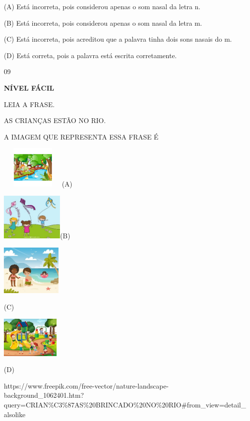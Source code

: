 {{\protect\hypertarget{_Hlk129358521}{}{}(A) Está incorreta, pois
considerou apenas o som nasal da letra n.

(B) Está incorreta, pois considerou apenas o som nasal da letra m.

(C) Está incorreta, pois acreditou que a palavra tinha dois sons nasais
do m.

(D) Está correta, pois a palavra está escrita corretamente.

\num{09}

\textbf{NÍVEL FÁCIL}

LEIA A FRASE.

AS CRIANÇAS ESTÃO NO RIO.

A IMAGEM QUE REPRESENTA ESSA FRASE É

\includegraphics[width=1.25000in,height=0.82361in]{media/image154.jpeg}(A)

\includegraphics[width=1.21181in,height=0.92014in]{media/image155.jpeg}(B)

\includegraphics[width=1.18125in,height=0.98472in]{media/image156.jpeg}

(C)

\includegraphics[width=1.13611in,height=0.80208in]{media/image157.jpeg}

(D)

https://www.freepik.com/free-vector/nature-landscape-background\_1062401.htm?query=CRIAN\%C3\%87AS\%20BRINCADO\%20NO\%20RIO\#from\_view=detail\_alsolike

}}
